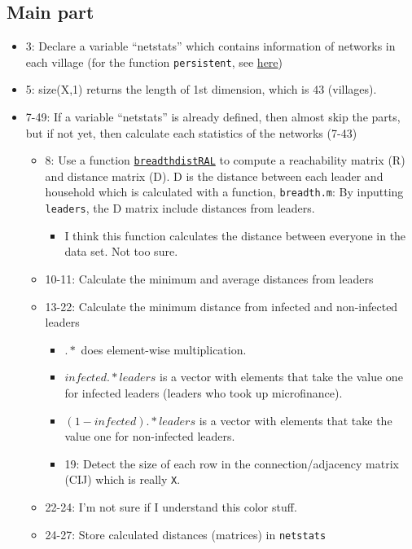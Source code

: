 \documentclass[10pt,letterpaper]{article}
\begin{document}
\subsection*{Main part}
\begin{itemize}
  \item 3: Declare a variable ``netstats'' which contains information of networks in each village (for the function \texttt{persistent}, see \href{https://www.mathworks.com/help/matlab/ref/persistent.html}{here})
  \item 5: size(X,1) returns the length of 1st dimension, which is 43 (villages).
  \item 7-49: If a variable ``netstats'' is already defined, then almost skip the parts, but if not yet, then calculate each statistics of the networks (7-43)
    \begin{itemize}
      \item 8: Use a function \hyperref[breadthdistRAL]{\texttt{breadthdistRAL}} to compute a reachability matrix (R) and distance matrix (D).
        D is the distance between each leader and household which is calculated with a function, \texttt{breadth.m}: 
        By inputting \texttt{leaders}, the D matrix include distances from leaders. 
      	\begin{itemize}
      		\item I think this function calculates the distance between everyone in the data set. Not too sure.
      	\end{itemize}
      \item 10-11: Calculate the minimum and average distances from leaders
      \item 13-22: Calculate the minimum distance from infected and non-infected leaders
      	\begin{itemize}
      		\item $.*$ does element-wise multiplication. 
      		\item $infected.*leaders$ is a vector with elements that take the value one for infected leaders (leaders who took up microfinance). 
      		\item $(1-infected).*leaders$ is a vector with elements that take the value one for non-infected leaders.
      		\item 19: Detect the size of each row in the connection/adjacency matrix (CIJ) which is really \texttt{X}. 
      	\end{itemize}
      \item 22-24: I'm not sure if I understand this color stuff.
      \item 24-27: Store calculated distances (matrices) in \texttt{netstats}

\end{itemize}
\end{itemize}
\end{document}
